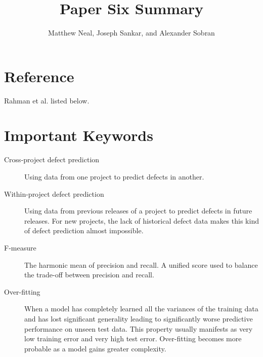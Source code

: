 \documentclass[english]{article}
\begin{document}
\title{Paper Six Summary}


\author{Matthew Neal, Joseph Sankar, and Alexander Sobran}

\maketitle

\section*{Reference}

Rahman et al. \cite{Rahman} listed below.


\section*{Important Keywords}
\begin{description}
\item [{Cross-project defect prediction}] Using data from one project to predict defects in another.
\item [{Within-project defect prediction}] Using data from previous releases of a project to predict defects in future releases. For new projects, the lack of historical defect data makes this kind of defect prediction almost impossible.
\item[{F-measure}] The harmonic mean of precision and recall. A unified score used to balance the trade-off between precision and recall.
\item[{Over-fitting}] When a model has completely learned all the variances of the training data and has lost significant generality leading to significantly worse predictive performance on unseen test data. This property usually manifests as very low training error and very high test error. Over-fitting becomes more probable as a model gains greater complexity.

\end{description}
\end{document}
